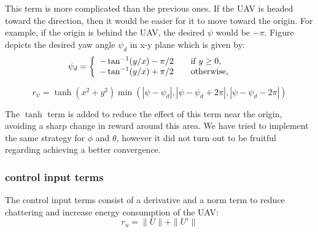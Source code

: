 This term is more complicated than the previous ones. If the UAV is headed toward the direction, then it would be easier for it to move toward the origin. For example, if the origin is behind the UAV, the desired $\psi$ would be $-\pi$. Figure  depicts the desired yaw angle $\psi_d$ in x-y plane which is given by:\\

\begin{equation}
	\psi_d=
	\left\{ 
	\begin{array}{ c l }
		-\tan^{-1}(y/x)-\pi/2 & \quad \textrm{if } y \geq0, \quad \quad  \\
		-\tan^{-1}(y/x) +\pi/2    & \quad \textrm{otherwise}, \quad \quad 
	\end{array}
	\right.
\end{equation}

\begin{equation}
	r_\psi = \tanh(x^2+y^2)\min(|\psi-\psi_d|, |\psi-\psi_d+2\pi|,|\psi-\psi_d-2\pi|)
\end{equation}

The $\tanh$ term is added to reduce the effect of this term near the origin, avoiding a sharp change in reward around this area. We have tried to implement the same strategy for $\phi$ and $\theta$, however it did not turn out to be fruitful regarding achieving a better convergence.

\subsubsection{control input terms}

The control input terms consist of a derivative and a norm term to reduce chattering and increase energy consumption of the UAV:
\begin{equation} \label{control_reward}
	r_u = \|U\| + \|U'\| 
\end{equation}


